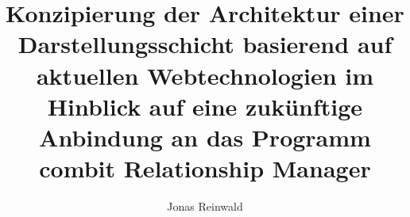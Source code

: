 
\title{Konzipierung der Architektur einer Darstellungsschicht basierend auf aktuellen Webtechnologien im Hinblick auf eine zukünftige Anbindung an das Programm combit Relationship Manager}

\author{Jonas Reinwald}

\docdate{\today}

\makecover[]
